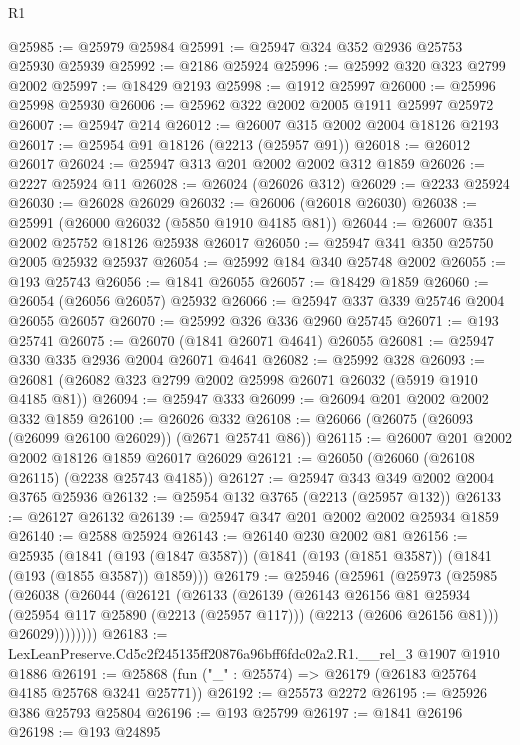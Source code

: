 \begin{lexlean}{R1}
\begin{coremodule}
@25985 := @25979 @25984
@25991 := @25947 @324 @352 @2936 @25753 @25930 @25939
@25992 := @2186 @25924
@25996 := @25992 @320 @323 @2799 @2002
@25997 := @18429 @2193
@25998 := @1912 @25997
@26000 := @25996 @25998 @25930
@26006 := @25962 @322 @2002 @2005 @1911 @25997 @25972
@26007 := @25947 @214
@26012 := @26007 @315 @2002 @2004 @18126 @2193
@26017 := @25954 @91 @18126 (@2213 (@25957 @91))
@26018 := @26012 @26017
@26024 := @25947 @313 @201 @2002 @2002 @312 @1859
@26026 := @2227 @25924 @11
@26028 := @26024 (@26026 @312)
@26029 := @2233 @25924
@26030 := @26028 @26029
@26032 := @26006 (@26018 @26030)
@26038 := @25991 (@26000 @26032 (@5850 @1910 @4185 @81))
@26044 := @26007 @351 @2002 @25752 @18126 @25938 @26017
@26050 := @25947 @341 @350 @25750 @2005 @25932 @25937
@26054 := @25992 @184 @340 @25748 @2002
@26055 := @193 @25743
@26056 := @1841 @26055
@26057 := @18429 @1859
@26060 := @26054 (@26056 @26057) @25932
@26066 := @25947 @337 @339 @25746 @2004 @26055 @26057
@26070 := @25992 @326 @336 @2960 @25745
@26071 := @193 @25741
@26075 := @26070 (@1841 @26071 @4641) @26055
@26081 := @25947 @330 @335 @2936 @2004 @26071 @4641
@26082 := @25992 @328
@26093 := @26081 (@26082 @323 @2799 @2002 @25998 @26071 @26032 (@5919 @1910 @4185 @81))
@26094 := @25947 @333
@26099 := @26094 @201 @2002 @2002 @332 @1859
@26100 := @26026 @332
@26108 := @26066 (@26075 (@26093 (@26099 @26100 @26029)) (@2671 @25741 @86))
@26115 := @26007 @201 @2002 @2002 @18126 @1859 @26017 @26029
@26121 := @26050 (@26060 (@26108 @26115) (@2238 @25743 @4185))
@26127 := @25947 @343 @349 @2002 @2004 @3765 @25936
@26132 := @25954 @132 @3765 (@2213 (@25957 @132))
@26133 := @26127 @26132
@26139 := @25947 @347 @201 @2002 @2002 @25934 @1859
@26140 := @2588 @25924
@26143 := @26140 @230 @2002 @81
@26156 := @25935
    (@1841 (@193 (@1847 @3587)) (@1841 (@193 (@1851 @3587)) (@1841 (@193 (@1855 @3587)) @1859)))
@26179 := @25946
    (@25961
      (@25973
        (@25985
          (@26038
            (@26044
              (@26121
                (@26133
                  (@26139
                    (@26143
                      @26156
                      @81
                      @25934
                      (@25954 @117 @25890 (@2213 (@25957 @117)))
                      (@2213 (@2606 @26156 @81)))
                    @26029))))))))
@26183 := LexLeanPreserve.Cd5c2f245135ff20876a96bff6fdc02a2.R1.__rel_3 @1907 @1910 @1886
@26191 := @25868 (fun ("_" : @25574) => @26179 (@26183 @25764 @4185 @25768 @3241 @25771))
@26192 := @25573 @2272
@26195 := @25926 @386 @25793 @25804
@26196 := @193 @25799
@26197 := @1841 @26196
@26198 := @193 @24895

\end{coremodule}
\end{lexlean}
